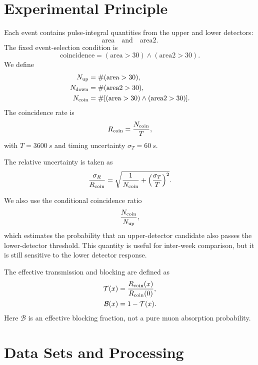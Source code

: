 \documentclass[aps,prl,twocolumn,superscriptaddress,nofootinbib]{revtex4-2}
\begin{document}
\section{Experimental Principle}

Each event contains pulse-integral quantities from the upper and lower detectors:
\begin{equation}
\mathrm{area}\quad \mathrm{and}\quad \mathrm{area2}.
\end{equation}
The fixed event-selection condition is
\begin{equation}
\mathrm{coincidence} = (\mathrm{area}>30)\land(\mathrm{area2}>30).
\end{equation}
We define
\begin{align}
N_{\rm up} &= \#(\mathrm{area}>30),\\
N_{\rm down} &= \#(\mathrm{area2}>30),\\
N_{\rm coin} &= \#[(\mathrm{area}>30)\land(\mathrm{area2}>30)].
\end{align}
The coincidence rate is
\begin{equation}
R_{\rm coin}=\frac{N_{\rm coin}}{T},
\end{equation}
with $T=\SI{3600}{s}$ and timing uncertainty $\sigma_T=\SI{60}{s}$.

The relative uncertainty is taken as
\begin{equation}
\frac{\sigma_R}{R_{\rm coin}}=
\sqrt{\frac{1}{N_{\rm coin}}+\left(\frac{\sigma_T}{T}\right)^2}.
\end{equation}

We also use the conditional coincidence ratio
\begin{equation}
\frac{N_{\rm coin}}{N_{\rm up}},
\end{equation}
which estimates the probability that an upper-detector candidate also passes the lower-detector threshold. This quantity is useful for inter-week comparison, but it is still sensitive to the lower detector response.

The effective transmission and blocking are defined as
\begin{align}
\mathcal{T}(x) &= \frac{R_{\rm coin}(x)}{R_{\rm coin}(0)},\\
\mathcal{B}(x) &= 1-\mathcal{T}(x).
\end{align}
Here $\mathcal{B}$ is an effective blocking fraction, not a pure muon absorption probability.

\section{Data Sets and Processing}
\end{document}
